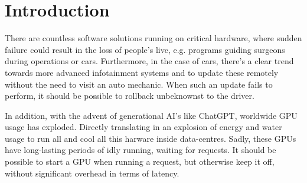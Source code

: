 \chapter{Introduction}
\label{chap:intro}



There are countless software solutions running on critical hardware, where sudden failure could result in the loss of people's live, e.g. programs guiding surgeons during operations or cars. Furthermore, in the case of cars, there's a clear trend towards more advanced infotainment systems and to update these remotely without the need to visit an auto mechanic. When such an update fails to perform, it should be possible to rollback unbeknownst to the driver.


In addition, with the advent of generational AI's like ChatGPT, worldwide GPU usage has exploded. Directly translating in an explosion of energy and water usage to run all and cool all this harware inside data-centres. Sadly, these GPUs have long-lasting periods of idly running, waiting for requests. It should be possible to start a GPU when running a request, but otherwise keep it off, without significant overhead in terms of latency.



